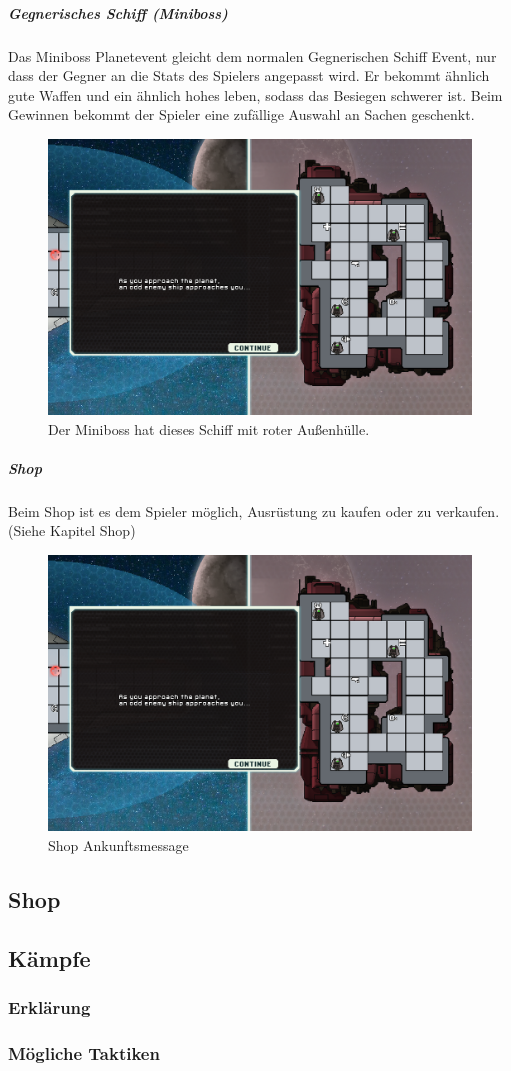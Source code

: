 \documentclass[fontsize=12pt,paper=a4,twoside]{scrartcl}
\begin{document}
\subparagraph{Gegnerisches Schiff (Miniboss)} Das Miniboss Planetevent gleicht dem normalen Gegnerischen Schiff Event, nur dass der Gegner an die Stats des Spielers angepasst wird. Er bekommt ähnlich gute Waffen und ein ähnlich hohes leben, sodass das Besiegen schwerer ist. Beim Gewinnen bekommt der Spieler eine zufällige Auswahl an Sachen geschenkt. 

\begin{figure}[H]
\centering
\includegraphics[width=1\linewidth]{DasSpiel/Karte/miniboss.png}
\caption{Der Miniboss hat dieses Schiff mit roter Außenhülle.}
\end{figure} 

\subparagraph{Shop} Beim Shop ist es dem Spieler möglich, Ausrüstung zu kaufen oder zu verkaufen. (Siehe Kapitel Shop)

\begin{figure}[H]
\centering
\includegraphics[width=1\linewidth]{DasSpiel/Karte/miniboss.png}
\caption{Shop Ankunftsmessage}
\end{figure}


\subsection{Shop}


\subsection{Kämpfe}

\subsubsection{Erklärung}

\subsubsection{Mögliche Taktiken}
\end{document}
